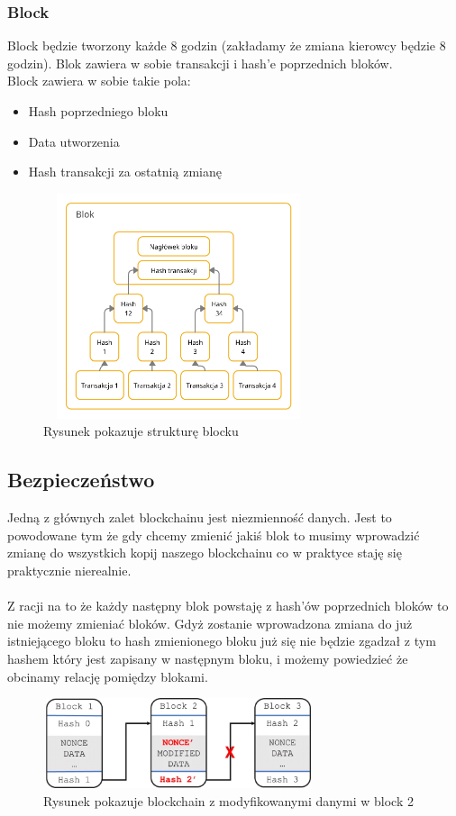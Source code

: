 \documentclass{sprawozdanie-agh}
\begin{document}
\subsubsection{Block}
Block będzie tworzony każde 8 godzin (zakładamy że zmiana kierowcy będzie 8 godzin). Blok zawiera w sobie transakcji i hash'e poprzednich bloków. \\
Block zawiera w sobie takie pola:
   \begin{itemize}
     \item Hash poprzedniego bloku 
     \item Data utworzenia
     \item Hash transakcji za ostatnią zmianę
   \end{itemize}

\begin{figure}[htbp]
    \centerline{\includegraphics[width=300px, height=250px]{block.png}}
    \caption{Rysunek pokazuje strukturę blocku}
    \label{fig}
\end{figure}
\newpage
\subsection{Bezpieczeństwo}
Jedną z głównych zalet blockchainu jest niezmienność danych. Jest to powodowane tym że gdy chcemy zmienić jakiś blok to musimy wprowadzić zmianę do wszystkich kopij naszego blockchainu co w praktyce staję się praktycznie nierealnie. \\ \\
Z racji na to że każdy następny blok powstaję z hash'ów poprzednich bloków to nie możemy zmieniać bloków. Gdyż zostanie wprowadzona zmiana do już istniejącego bloku to hash zmienionego bloku już się nie będzie zgadzał z tym hashem który jest zapisany w następnym bloku, i możemy powiedzieć że obcinamy relację pomiędzy blokami. 
\begin{figure}[htbp]
    \centerline{\includegraphics[width=300px, height=100px]{invalid_block.png}}
    \caption{Rysunek pokazuje blockchain z modyfikowanymi danymi w block 2}
    \label{fig}
\end{figure}
\end{document}

